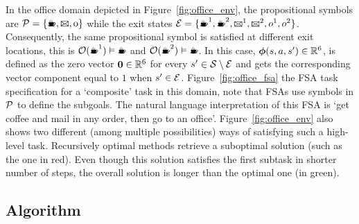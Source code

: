 \begin{example}[Example 1] In the office domain depicted in Figure~\ref{fig:office_env}, the propositional symbols are $\cP=\{\text{\coffee}, \text{\mail}, \text{o}\}$ while the exit states $\cE=\{\text{\coffee}^1, \text{\coffee}^2,\text{\mail}^1,\text{\mail}^2,o^1,o^2\}$. Consequently, the same propositional symbol is satisfied at different exit locations, this is $\cO(\text{\coffee}^1)\vDash\text{\coffee}$ and $\cO(\text{\coffee}^2)\vDash\text{\coffee}$. In this case, $\boldsymbol\phi(s, a, s')\in\mathbb{R}^6$, is defined as the zero vector $\mathbf{0}\in\mathbb{R}^6$ for every $s'\in\mathcal{S}\setminus\mathcal{E}$ and gets the corresponding vector component equal to $1$ when $s'\in\mathcal{E}$. Figure~\ref{fig:office_fsa} the FSA task specification for a `composite' task in this domain, note that FSAs use symbols in $\mathcal{P}$ to define the subgoals. The natural language interpretation of this FSA is `get coffee and mail in any order, then go to an office'. Figure~\ref{fig:office_env} also shows two different (among multiple possibilities) ways of satisfying such a high-level task. Recursively optimal methods retrieve a suboptimal solution (such as the one in red). Even though this solution satisfies the first subtask in shorter number of steps, the overall solution is longer than the optimal one (in green).
\end{example}


\subsection{Algorithm} 

